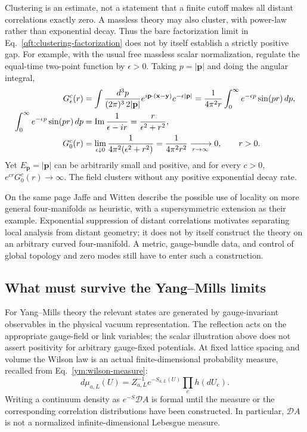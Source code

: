 Clustering is an estimate, not a statement that a finite cutoff makes
all distant correlations exactly zero. A massless theory may also
cluster, with power-law rather than exponential decay. Thus the bare
factorization limit in Eq.~\eqref{qft:clustering-factorization} does not
by itself establish a strictly positive gap. For example, with the usual
free massless scalar normalization, regulate the equal-time two-point
function by $\epsilon>0$. Taking $p=|\mathbf p|$ and doing the angular
integral,
\begin{align}
 G^c_\epsilon(r)
 &=\int\frac{d^3p}{(2\pi)^3\,2|\mathbf p|}
       e^{i\mathbf p\cdot(\mathbf x-\mathbf y)}e^{-\epsilon|\mathbf p|}
   =\frac1{4\pi^2r}\int_0^\infty e^{-\epsilon p}\sin(pr)\,dp,
   \notag\\
 \int_0^\infty e^{-\epsilon p}\sin(pr)\,dp
 &=\operatorname{Im}\frac1{\epsilon-ir}
   =\frac{r}{\epsilon^2+r^2},\notag\\
 G^c_0(r)
 &=\lim_{\epsilon\downarrow0}\frac1{4\pi^2(\epsilon^2+r^2)}
   =\frac1{4\pi^2r^2}\xrightarrow[r\to\infty]{}0,
   \qquad r>0.
 \label{qft:massless-power-law-clustering}
\end{align}
Yet $E_{\mathbf p}=|\mathbf p|$ can be arbitrarily small and positive,
and for every $c>0$, $e^{cr}G^c_0(r)\to\infty$. The field clusters
without any positive exponential decay rate.

On the same page Jaffe and Witten describe the possible use of locality
on more general four-manifolds as heuristic, with a supersymmetric
extension as their example. Exponential suppression of distant
correlations motivates separating local analysis from distant geometry;
it does not by itself construct the theory on an arbitrary curved
four-manifold. A metric, gauge-bundle data, and control of global topology
and zero modes still have to enter such a construction.

\subsection{What must survive the Yang--Mills limits}
For Yang--Mills theory the relevant states are generated by gauge-invariant
observables in the physical vacuum representation. The reflection acts on
the appropriate gauge-field or link variables; the scalar illustration
above does not assert positivity for arbitrary gauge-fixed potentials.
At fixed lattice spacing and volume the Wilson law is an actual
finite-dimensional probability measure, recalled from
Eq.~\eqref{ym:wilson-measure}:
\begin{equation}\label{qft:euclidean-wilson-probability}
 d\mu_{a,L}(U)=Z_{a,L}^{-1}e^{-S_{a,L}(U)}\prod_e h(dU_e).
\end{equation}
Writing a continuum density as $e^{-S}\mathcal D A$ is formal until the
measure or the corresponding correlation distributions have been
constructed. In particular, $\mathcal D A$ is not a normalized
infinite-dimensional Lebesgue measure.

